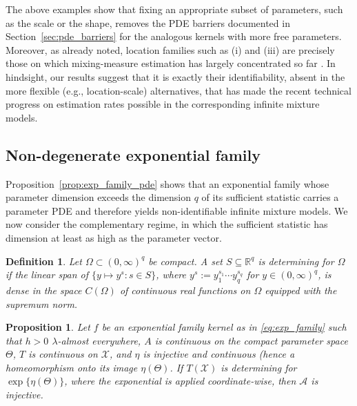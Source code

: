 \documentclass[11pt,twoside]{article} %
\newtheorem{proposition}{Proposition}
\newtheorem{definition}{Definition}
\begin{document}
The above examples show that fixing an appropriate subset of parameters, such as
the scale or the shape, removes the PDE barriers documented in
Section~\ref{sec:pde_barriers} for the analogous kernels with more free
parameters. Moreover, as already noted, location families such as (i) and (iii)
are precisely those on which mixing-measure estimation has largely concentrated
so far \citep[among others]{Nguyen-13,Gao2016Posterior}. In hindsight, our results suggest that
it is exactly their identifiability, absent in the more flexible (e.g., location-scale)
alternatives, that has made the recent technical progress on estimation rates possible in the
corresponding infinite mixture models.


\subsection{Non-degenerate exponential family}\label{sec:nondegenerate}

Proposition~\ref{prop:exp_family_pde} shows that an exponential family whose parameter dimension exceeds the dimension $q$ of its sufficient statistic carries a parameter PDE and therefore yields non-identifiable infinite mixture models. We now consider the complementary regime, in which the sufficient statistic has dimension at least as high as the parameter vector.

\begin{definition}\label{def:determining}
Let $\Omega\subset(0,\infty)^q$ be compact. A set $S\subseteq\mathbb R^q$ is \emph{determining for $\Omega$} if the linear span of $\{y\mapsto y^{s}:s\in S\}$, where $y^{s}:=y_1^{s_1}\cdots y_q^{s_q}$ for $y\in(0,\infty)^q$, is dense in the space $C(\Omega)$ of continuous real functions on $\Omega$ equipped with the supremum norm.
\end{definition}


\begin{proposition}\label{prop:exp_family_identif}
Let $f$ be an exponential family kernel as in \eqref{eq:exp_family} such that $h>0$ $\lambda$-almost everywhere, $A$ is continuous on the compact parameter space $\Theta$, $T$ is continuous on $\mathcal X$, and  $\eta$ is injective and continuous (hence a homeomorphism onto its image $\eta(\Theta)$. If $T(\mathcal X)$ is determining for $\exp\{\eta(\Theta)\}$, where the exponential is applied coordinate-wise, then $\mathcal A$ is injective.
\end{proposition}
\end{document}
